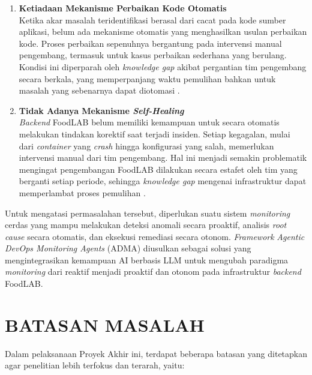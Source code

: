 \begin{enumerate}[label=\arabic*., leftmargin=*]
  \item \textbf{Ketiadaan Mekanisme Perbaikan Kode Otomatis}\\
        Ketika akar masalah teridentifikasi berasal dari cacat pada kode sumber aplikasi, belum ada mekanisme otomatis yang menghasilkan usulan perbaikan kode. Proses perbaikan sepenuhnya bergantung pada intervensi manual pengembang, termasuk untuk kasus perbaikan sederhana yang berulang. Kondisi ini diperparah oleh \textit{knowledge gap} akibat pergantian tim pengembang secara berkala, yang memperpanjang waktu pemulihan bahkan untuk masalah yang sebenarnya dapat diotomasi \cite{liang2023self}.

  \item \textbf{Tidak Adanya Mekanisme \textit{Self-Healing}}\\
        \textit{Backend} FoodLAB belum memiliki kemampuan untuk secara otomatis melakukan tindakan korektif saat terjadi insiden. Setiap kegagalan, mulai dari \textit{container} yang \textit{crash} hingga konfigurasi yang salah, memerlukan intervensi manual dari tim pengembang. Hal ini menjadi semakin problematik mengingat pengembangan FoodLAB dilakukan secara estafet oleh tim yang berganti setiap periode, sehingga \textit{knowledge gap} mengenai infrastruktur dapat memperlambat proses pemulihan \cite{liang2023self}.
\end{enumerate}

Untuk mengatasi permasalahan tersebut, diperlukan suatu sistem \textit{monitoring} cerdas yang mampu melakukan deteksi anomali secara proaktif, analisis \textit{root cause} secara otomatis, dan eksekusi remediasi secara otonom. \textit{Framework} \textit{Agentic DevOps Monitoring Agents} (ADMA) diusulkan sebagai solusi yang mengintegrasikan kemampuan AI berbasis LLM untuk mengubah paradigma \textit{monitoring} dari reaktif menjadi proaktif dan otonom pada infrastruktur \textit{backend} FoodLAB.

\section{BATASAN MASALAH}

Dalam pelaksanaan Proyek Akhir ini, terdapat beberapa batasan yang ditetapkan agar penelitian lebih terfokus dan terarah, yaitu:

